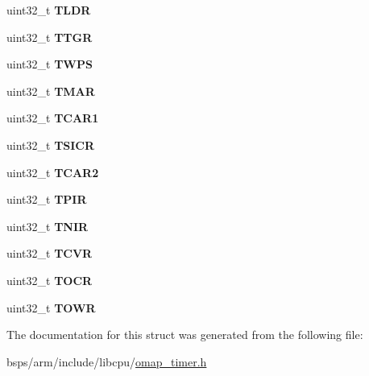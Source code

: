 \begin{DoxyCompactItemize}
uint32\+\_\+t {\bfseries T\+L\+DR}
\item 
\mbox{\label{structomap__timer__registers_ac682802bf0a56d4bea0b0a5f6b37b6f8}} 
uint32\+\_\+t {\bfseries T\+T\+GR}
\item 
\mbox{\label{structomap__timer__registers_a0256c2bbe3b34d56892ce7c3db70ccfe}} 
uint32\+\_\+t {\bfseries T\+W\+PS}
\item 
\mbox{\label{structomap__timer__registers_aa8fa00c1d2b1d24309c7a5ef5b2255d6}} 
uint32\+\_\+t {\bfseries T\+M\+AR}
\item 
\mbox{\label{structomap__timer__registers_a9c78cfca1b39fa2f5c654c6bc21cd726}} 
uint32\+\_\+t {\bfseries T\+C\+A\+R1}
\item 
\mbox{\label{structomap__timer__registers_a874876b193e6041c6fb2fff1dcc85c1e}} 
uint32\+\_\+t {\bfseries T\+S\+I\+CR}
\item 
\mbox{\label{structomap__timer__registers_a2726969a4d5883848dd75ccc3768c5ad}} 
uint32\+\_\+t {\bfseries T\+C\+A\+R2}
\item 
\mbox{\label{structomap__timer__registers_a06236e93988c1cf0ede84b55d60d6bb4}} 
uint32\+\_\+t {\bfseries T\+P\+IR}
\item 
\mbox{\label{structomap__timer__registers_af7553853425120396032fd2d61d34460}} 
uint32\+\_\+t {\bfseries T\+N\+IR}
\item 
\mbox{\label{structomap__timer__registers_a5c2f22cf0d7b3aee5ddd940ba4fa541c}} 
uint32\+\_\+t {\bfseries T\+C\+VR}
\item 
\mbox{\label{structomap__timer__registers_a37d2b1831945ba3974243536c31bbe92}} 
uint32\+\_\+t {\bfseries T\+O\+CR}
\item 
\mbox{\label{structomap__timer__registers_afe79d707f7f1bea3f5f72f8bfab45059}} 
uint32\+\_\+t {\bfseries T\+O\+WR}
\end{DoxyCompactItemize}


The documentation for this struct was generated from the following file\+:\begin{DoxyCompactItemize}
\item 
bsps/arm/include/libcpu/\mbox{\hyperlink{omap__timer_8h}{omap\+\_\+timer.\+h}}\end{DoxyCompactItemize}

